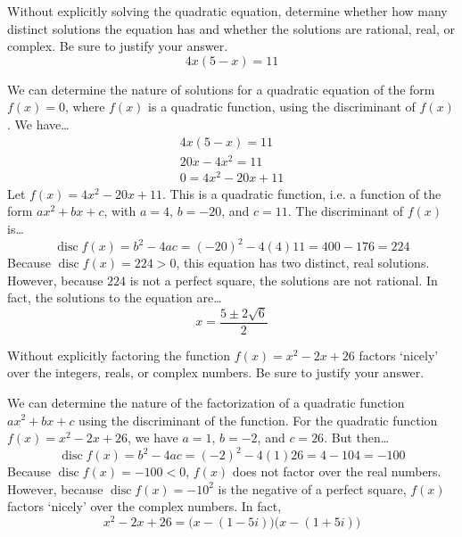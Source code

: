 \documentclass[11pt,letterpaper]{article}
\DeclareMathOperator{\disc}{disc}
\begin{document}

 Without explicitly solving the quadratic equation, determine whether how many distinct solutions the equation has and whether the solutions are rational, real, or complex. Be sure to justify your answer.
	\[
	4x(5 - x)= 11
	\] \pspace

\sol We can determine the nature of solutions for a quadratic equation of the form $f(x)= 0$, where $f(x)$ is a quadratic function, using the discriminant of $f(x)$. We have\dots
	\[
	\begin{aligned}
	4x(5 - x)= 11 \\
	20x - 4x^2= 11 \\
	0= 4x^2 - 20x + 11
	\end{aligned}
	\]
Let $f(x)= 4x^2 - 20x + 11$. This is a quadratic function, i.e. a function of the form $ax^2 + bx + c$, with $a= 4$, $b= -20$, and $c= 11$. The discriminant of $f(x)$ is\dots
	\[
	\disc f(x)= b^2 - 4ac= (-20)^2 - 4(4)11= 400 - 176= 224
	\]
Because $\disc f(x)= 224 > 0$, this equation has two distinct, real solutions. However, because $224$ is not a perfect square, the solutions are not rational. In fact, the solutions to the equation are\dots
	\[
	x= \dfrac{5 \pm 2 \sqrt{6}}{2}
	\]



\newpage



 Without explicitly factoring the function $f(x)= x^2 - 2x + 26$ factors `nicely' over the integers, reals, or complex numbers. Be sure to justify your answer. \pspace

\sol We can determine the nature of the factorization of a quadratic function $ax^2 + bx + c$ using the discriminant of the function. For the quadratic function $f(x)= x^2 - 2x + 26$, we have $a= 1$, $b= -2$, and $c= 26$. But then\dots
	\[
	\disc f(x)= b^2 - 4ac= (-2)^2 - 4(1)26= 4 - 104= -100
	\]
Because $\disc f(x)= -100 < 0$, $f(x)$ does not factor over the real numbers. However, because $\disc f(x)= -10^2$ is the negative of a perfect square, $f(x)$ factors `nicely' over the complex numbers. In fact, 
	\[
	x^2 - 2x + 26= \big(x - (1 - 5i) \big) \big(x - (1 + 5i) \big)
	\]



\newpage
\end{document}
